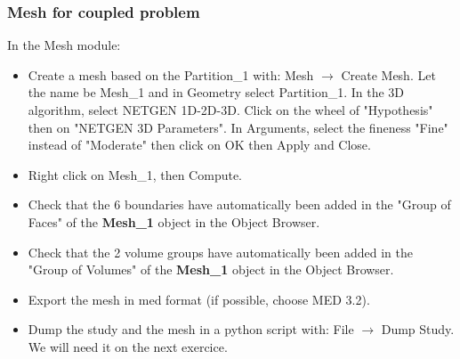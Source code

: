 \documentclass[10pt, hyperref={unicode=true,pdfusetitle, bookmarks=true,bookmarksnumbered=false,bookmarksopen=false, breaklinks=false,pdfborder={0 0l 1},backref=true,colorlinks=true,linkcolor=darkblue,pageanchor}]{beamer}
\begin{document}
\begin{frame}
\frametitle{Mesh for coupled problem}

\begin{block}{In the Mesh module:}
\begin{itemize} 

 \item Create a mesh based on the Partition\_1 with: Mesh $\rightarrow$ Create Mesh. Let the name be Mesh\_1 and in Geometry select Partition\_1. In the 3D algorithm, select NETGEN 1D-2D-3D. Click on the wheel of "Hypothesis" then on "NETGEN 3D Parameters". In Arguments, select the fineness "Fine" instead of "Moderate" then click on OK then Apply and Close.
 
 \item Right click on Mesh\_1, then Compute.
 
 \item Check that the 6 boundaries have automatically been added in the "Group of Faces" of the \textbf{Mesh\_1} object in the Object Browser.
 
 \item Check that the 2 volume groups have automatically been added in the "Group of Volumes" of the \textbf{Mesh\_1} object in the Object Browser.
 
 \item Export the mesh in med format (if possible, choose MED 3.2).

 \item Dump the study and the mesh in a python script with: File $\rightarrow$ Dump Study. \\
 We will need it on the next exercice. 
 
\end{itemize}
\end{block}

\end{frame}
\end{document}
